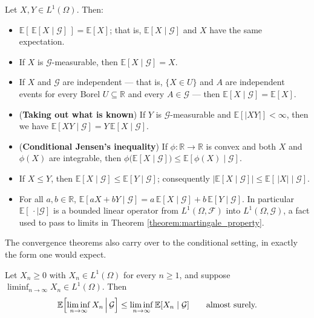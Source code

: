 \begin{proposition}\label{prop:condexpproperties}
Let $X, Y \in L^1(\Omega)$. Then:
\begin{itemize}
    \item[1.] $\mathbb{E}\!\left[\,\mathbb{E}[X \mid \mathcal{G}]\,\right] = \mathbb{E}[X]$; that is, $\mathbb{E}[X\mid\mathcal{G}]$ and $X$ have the same expectation.
    \item[2.] If $X$ is $\mathcal{G}$-measurable, then $\mathbb{E}[X \mid \mathcal{G}] = X$.
    \item[3.] If $X$ and $\mathcal{G}$ are independent --- that is, $\{X \in U\}$ and $A$ are independent events for every Borel $U \subseteq \mathbb{R}$ and every $A \in \mathcal{G}$ --- then $\mathbb{E}[X \mid \mathcal{G}] = \mathbb{E}[X]$.
    \item[4.] (\textbf{Taking out what is known}) If $Y$ is $\mathcal{G}$-measurable and $\mathbb{E}[|XY|]<\infty$, then we have $\mathbb{E}[XY \mid \mathcal{G}] = Y\,\mathbb{E}[X \mid \mathcal{G}]$.
    \item[5.] (\textbf{Conditional Jensen's inequality}) If $\phi : \mathbb{R} \to \mathbb{R}$ is convex and both $X$ and $\phi(X)$ are integrable, then $\phi\bigl(\mathbb{E}[X \mid \mathcal{G}]\bigr) \leq \mathbb{E}[\phi(X) \mid \mathcal{G}]$.
    \item[6.] If $X \leq Y$, then $\mathbb{E}[X \mid \mathcal{G}] \leq \mathbb{E}[Y \mid \mathcal{G}]$; consequently $\left| \mathbb{E}[X \mid \mathcal{G}] \right| \leq \mathbb{E}[\,|X| \mid \mathcal{G}]$.
    \item[7.] For all $a,b \in \mathbb{R}$, $\mathbb{E}[aX + bY \mid \mathcal{G}] = a\,\mathbb{E}[X \mid \mathcal{G}] + b\,\mathbb{E}[Y \mid \mathcal{G}]$. In particular $\mathbb{E}[\,\cdot \mid \mathcal{G}]$ is a bounded linear operator from $L^{1}(\Omega,\mathcal{F})$ into $L^{1}(\Omega,\mathcal{G})$, a fact used to pass to limits in Theorem \ref{theorem:martingale_property}.
\end{itemize}
\qedopentext
\end{proposition}

The convergence theorems also carry over to the conditional setting, in exactly the form one would
expect.

\begin{proposition}\label{prop:condfatou}
Let $X_n \geq 0$ with $X_n \in L^1(\Omega)$ for every $n \geq 1$, and suppose
$\liminf_{n\to\infty} X_n \in L^1(\Omega)$. Then
\[
\mathbb{E}\Bigl[\liminf_{n \to \infty} X_n \,\Big|\, \mathcal{G}\Bigr]
\leq \liminf_{n \to \infty} \mathbb{E}[X_n \mid \mathcal{G}] \qquad \text{almost surely.}
\]
\qedopen
\end{proposition}

